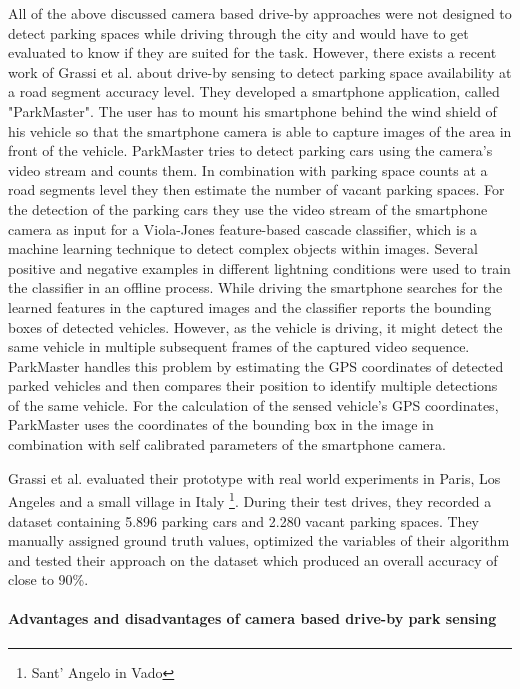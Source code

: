 All of the above discussed camera based drive-by approaches were not designed to detect parking spaces while driving through the city and would have to get evaluated to know if they are suited for the task. However, there exists a recent work of Grassi et al. \cite{Grassi:2017:PIE:3132211.3134452} about drive-by sensing to detect parking space availability at a road segment accuracy level. They developed a smartphone application, called "ParkMaster". The user has to mount his smartphone behind the wind shield of his vehicle so that the smartphone camera is able to capture images of the area in front of the vehicle. ParkMaster tries to detect parking cars using the camera's video stream and counts them. In combination with parking space counts at a road segments level they then estimate the number of vacant parking spaces. For the detection of the parking cars they use the video stream of the smartphone camera as input for a Viola-Jones feature-based cascade classifier, which is a machine learning technique to detect complex objects within images. Several positive and negative examples in different lightning conditions were used to train the classifier in an offline process. While driving the smartphone searches for the learned features in the captured images and the classifier reports the bounding boxes of detected vehicles. However, as the vehicle is driving, it might detect the same vehicle in multiple subsequent frames of the captured video sequence. ParkMaster handles this problem by estimating the GPS coordinates of detected parked vehicles and then compares their position to identify multiple detections of the same vehicle. 
For the calculation of the sensed vehicle's GPS coordinates, ParkMaster uses the coordinates of the bounding box in the image in combination with self calibrated parameters of the smartphone camera.

Grassi et al. evaluated their prototype with real world experiments in Paris, Los Angeles and a small village in Italy \footnote{Sant' Angelo in Vado}. During their test drives, they recorded a dataset containing 5.896 parking cars and 2.280 vacant parking spaces. They manually assigned ground truth values, optimized the variables of their algorithm and tested their approach on the dataset which produced an overall accuracy of close to 90\%. 


\paragraph{Advantages and disadvantages of camera based drive-by park sensing}

